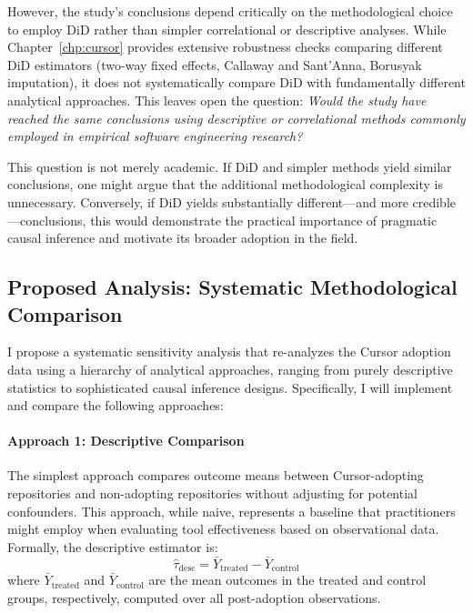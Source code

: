 However, the study's conclusions depend critically on the methodological choice to employ DiD rather than simpler correlational or descriptive analyses.
While Chapter~\ref{chp:cursor} provides extensive robustness checks comparing different DiD estimators (two-way fixed effects, Callaway and Sant'Anna, Borusyak imputation), it does not systematically compare DiD with fundamentally different analytical approaches.
This leaves open the question: \emph{Would the study have reached the same conclusions using descriptive or correlational methods commonly employed in empirical software engineering research?}

This question is not merely academic.
If DiD and simpler methods yield similar conclusions, one might argue that the additional methodological complexity is unnecessary.
Conversely, if DiD yields substantially different---and more credible---conclusions, this would demonstrate the practical importance of pragmatic causal inference and motivate its broader adoption in the field.

\subsection{Proposed Analysis: Systematic Methodological Comparison}

I propose a systematic sensitivity analysis that re-analyzes the Cursor adoption data using a hierarchy of analytical approaches, ranging from purely descriptive statistics to sophisticated causal inference designs.
Specifically, I will implement and compare the following approaches:

\paragraph{Approach 1: Descriptive Comparison}
The simplest approach compares outcome means between Cursor-adopting repositories and non-adopting repositories without adjusting for potential confounders.
This approach, while naive, represents a baseline that practitioners might employ when evaluating tool effectiveness based on observational data.
Formally, the descriptive estimator is:
\begin{equation}
\hat{\tau}_{\text{desc}} = \bar{Y}_{\text{treated}} - \bar{Y}_{\text{control}}
\end{equation}
where $\bar{Y}_{\text{treated}}$ and $\bar{Y}_{\text{control}}$ are the mean outcomes in the treated and control groups, respectively, computed over all post-adoption observations.


